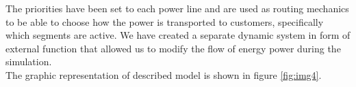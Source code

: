 \documentclass[a4paper]{article}
\begin{document}

The priorities have been set to each power line and are used as routing mechanics to be able to choose how the power is transported to customers, specifically which segments are active. We have created a separate dynamic system in form of external function that allowed us to modify the flow of energy power during the simulation.\\


The graphic representation of described model is shown in figure \ref{fig:img4}.\\
\end{document}
